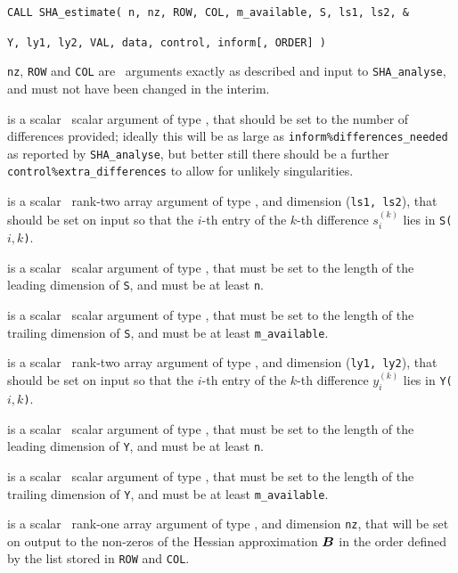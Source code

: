 \documentclass{galahad}
\newcommand{\packagename}{SHA}
\begin{document}
\hspace{8mm}
{\tt CALL \packagename\_estimate( n, nz, ROW, COL, m\_available, S, ls1, ls2, \&}
\vspace*{-1mm}

\hspace{42mm}
{\tt Y, ly1, ly2, VAL, data, control, inform[, ORDER] )}

\vspace*{-2mm}
\begin{description}
 {\tt nz}, {\tt ROW} and {\tt COL} are  \intentin\ arguments
exactly as described and input to {\tt \packagename\_analyse},
and must not have been changed in the interim.

is a scalar \intentin\ scalar argument of type \integer, that should
be set to the number of differences provided; ideally this will
be as large as {\tt inform\%differences\_needed} as reported by
{\tt \packagename\_\-analyse}, but better still there should be a
further {\tt control\%extra\_differences} to allow for unlikely singularities.

 is a scalar \intentin\ rank-two array argument of type
\realdp, and dimension ({\tt ls1, ls2}), that should be set on input
so that the $i$-th entry of the $k$-th difference $s_i^{(k)}$ lies in
{\tt S(}$i, k${\tt )}.

is a scalar \intentin\ scalar argument of type \integer, that must be
set to the length of the leading dimension of {\tt S}, and must be at least
{\tt n}.

is a scalar \intentin\ scalar argument of type \integer, that must be
set to the length of the trailing dimension of {\tt S}, and must be at least
{\tt m\_available}.

 is a scalar \intentin\ rank-two array argument of type
\realdp, and dimension ({\tt ly1, ly2}), that should be set on input
so that the $i$-th entry of the $k$-th difference $y_i^{(k)}$ lies in
{\tt Y(}$i, k${\tt )}.

is a scalar \intentin\ scalar argument of type \integer, that must be
set to the length of the leading dimension of {\tt Y}, and must be at least
{\tt n}.

is a scalar \intentin\ scalar argument of type \integer, that must be
set to the length of the trailing dimension of {\tt Y}, and must be at least
{\tt m\_available}.

 is a scalar \intentout\ rank-one array argument of type
\realdp, and dimension {\tt nz}, that will be set on output
to the non-zeros of the Hessian approximation ${\bm{B}}$ in the
order defined by the list stored in {\tt ROW} and {\tt COL}.


\end{description}
\end{document}
